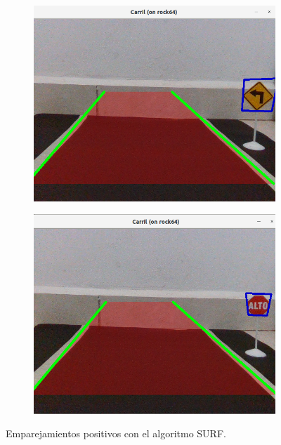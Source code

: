 \begin{figure}[htbp!]
	\centering
	\begin{subfigure}[htbp!]{0.4\textwidth}
		\includegraphics[width=\textwidth]{./Figuras/SSURF1}
	\end{subfigure}
	\begin{subfigure}[htbp!]{0.4\textwidth}
		\includegraphics[width=\textwidth]{./Figuras/SSURF2}
	\end{subfigure}
	\caption{Emparejamientos positivos con el algoritmo SURF.}
	\label{fig:SSURF}
\end{figure}

